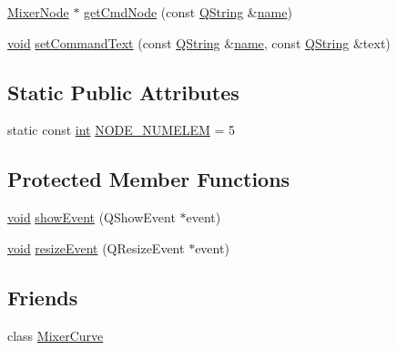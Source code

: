 \begin{DoxyCompactItemize}
\item 
\hyperlink{class_mixer_node}{Mixer\-Node} $\ast$ \hyperlink{group___u_a_v_object_widget_utils_ga2c1fc49cc5fe0c0b20163b8249d9fabf}{get\-Cmd\-Node} (const \hyperlink{group___u_a_v_objects_plugin_gab9d252f49c333c94a72f97ce3105a32d}{Q\-String} \&\hyperlink{glext_8h_ad977737dfc9a274a62741b9500c49a32}{name})
\item 
\hyperlink{group___u_a_v_objects_plugin_ga444cf2ff3f0ecbe028adce838d373f5c}{void} \hyperlink{group___u_a_v_object_widget_utils_gaa3ea4c7117915989815218e35875c190}{set\-Command\-Text} (const \hyperlink{group___u_a_v_objects_plugin_gab9d252f49c333c94a72f97ce3105a32d}{Q\-String} \&\hyperlink{glext_8h_ad977737dfc9a274a62741b9500c49a32}{name}, const \hyperlink{group___u_a_v_objects_plugin_gab9d252f49c333c94a72f97ce3105a32d}{Q\-String} \&text)
\end{DoxyCompactItemize}
\subsection*{Static Public Attributes}
\begin{DoxyCompactItemize}
\item 
static const \hyperlink{ioapi_8h_a787fa3cf048117ba7123753c1e74fcd6}{int} \hyperlink{group___u_a_v_object_widget_utils_ga359d5a2efb6966cba1d78bbdb2e7759d}{N\-O\-D\-E\-\_\-\-N\-U\-M\-E\-L\-E\-M} = 5
\end{DoxyCompactItemize}
\subsection*{Protected Member Functions}
\begin{DoxyCompactItemize}
\item 
\hyperlink{group___u_a_v_objects_plugin_ga444cf2ff3f0ecbe028adce838d373f5c}{void} \hyperlink{group___u_a_v_object_widget_utils_gadd0a4729bbf94f44e38a0bcacb353583}{show\-Event} (Q\-Show\-Event $\ast$event)
\item 
\hyperlink{group___u_a_v_objects_plugin_ga444cf2ff3f0ecbe028adce838d373f5c}{void} \hyperlink{group___u_a_v_object_widget_utils_gaa93b51b2d0662bf28c5040a7b7386eed}{resize\-Event} (Q\-Resize\-Event $\ast$event)
\end{DoxyCompactItemize}
\subsection*{Friends}
\begin{DoxyCompactItemize}
\item 
class \hyperlink{group___u_a_v_object_widget_utils_ga4dec7e6867bf4ed62c5309f7149f0dd0}{Mixer\-Curve}
\end{DoxyCompactItemize}


